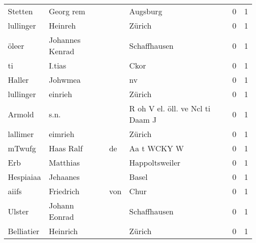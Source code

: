 \begin{tabular}{llllrr}
                  Stetten &                          Georg rem &             &                                    Augsburg &          0 &         1 \\
                lullinger &                            Heinreh &             &                                      Zürich &          0 &         1 \\
                    öleer &                    Johannes Kenrad &             &                                Schaffhausen &          0 &         1 \\
                       ti &                             I.tias &             &                                        Ckor &          0 &         1 \\
                   Haller &                            Johwmea &             &                                          nv &          0 &         1 \\
                lullinger &                            einrieh &             &                                      Zürich &          0 &         1 \\
                   Armold &                               s.n. &             &            R oh V el. öll. ve Ncl ti Daam J &          0 &         1 \\
                 lallimer &                            eimrieh &             &                                      Zürich &          0 &         1 \\
                   mTwufg &                          Haas Ralf &          de &                                 Aa t WCKY W &          0 &         1 \\
                      Erb &                           Matthias &             &                              Happoltsweiler &          0 &         1 \\
                Hespiaiaa &                           Jehaanes &             &                                       Basel &          0 &         1 \\
                    aiifs &                          Friedrich &         von &                                        Chur &          0 &         1 \\
                   Ulster &                      Johann Eonrad &             &                                Schaffhausen &          0 &         1 \\
               Belliatier &                           Heinrich &             &                                      Zürich &          0 &         1 \\

\end{tabular}
